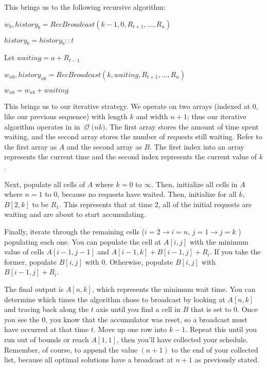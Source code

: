 \documentclass[12pt]{article}
\newcommand{\BigO}[1]{\ensuremath{\operatorname{\mathcal{O}}\bigl(#1\bigr)}}
\begin{document}
This brings us to the following recursive algorithm:

\begin{algorithm}[H]




$w_{b}, history_{b} = RecBroadcast(k-1, 0, R_{t+1}, \dots, R_{n})$

$history_{b} = history_{b} :: t $


Let $waiting = a + R_{t-1}$

$w_{nb}, history_{nb} = RecBroadcast(k, waiting, R_{t+1}, \dots, R_{n} )$

$w_{nb} = w_{nb} + waiting$


\end{algorithm}

This brings us to our iterative strategy. We operate on two arrays (indexed at 0, like our previous sequence) with length $k$ and width $n+1$; thus our iterative algorithm operates in in \BigO{nk}. The first array stores the amount of time spent waiting, and the second array stores the number of requests still waiting. Refer to the first array as $A$ and the second array as $B$. The first index into an array represents the current time and the second index represents the current value of $k$.

Next, populate all cells of $A$ where $k=0$ to $\infty$. Then, initialize all cells in $A$ where $n=1$ to $0$, because no requests have waited. Then, initialize for all $k$, $B[2, k]$ to be $R_{1}$. This represents that at time 2, all of the initial requests are waiting and are about to start accumulating.

Finally, iterate through the remaining cells ($i = 2 \to i = n$, $j = 1 \to j = k$ ) populating each one. You can populate the cell at $A[i, j]$ with the minimum value of cells $A[i-1, j-1]$ and $A[i-1, k] + B[i-1, j] + R_{i}$. If you take the former, populate $B[i, j]$ with 0. Otherwise, populate $B[i, j]$ with $B[i-1, j] + R_{i}$.

The final output is $A[n, k]$, which represents the minimum wait time. You can determine which times the algorithm chose to broadcast by looking at $A[n, k]$ and tracing back along the $t$ axis until you find a cell in $B$ that is set to 0. Once you see the 0, you know that the accumulator was reset, so a broadcast must have occurred at that time $t$. Move up one row into $k-1$. Repeat this until you run out of bounds or reach $A[1, 1]$, then you'll have collected your schedule. Remember, of course, to append the value $(n+1)$ to the end of your collected list, because all optimal solutions have a broadcast at $n+1$ as previously stated.
\end{document}
